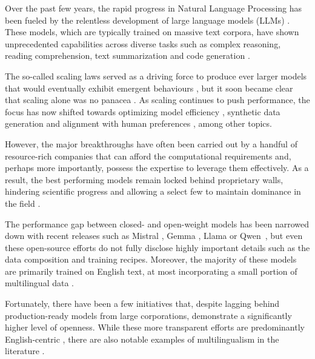 Over the past few years, the rapid progress in Natural Language Processing has been fueled by the relentless development of large language models (LLMs) \cite{survey_llms_1,survey_llms_2}. These models, which are typically trained on massive text corpora, have shown unprecedented capabilities across diverse tasks such as complex reasoning, reading comprehension, text summarization and code generation \cite{big_bench_tasks, measuring_multitask, code_evaluation}. 

The so-called scaling laws \cite{chinchilla,scaling_laws} served as a driving force to produce ever larger models that would eventually exhibit emergent behaviours \cite{emergent_abilities}, but it soon became clear that scaling alone was no panacea \cite{llama1,instructgpt}. As scaling continues to push performance, the focus has now shifted towards optimizing model efficiency \cite{fp8,flash2}, synthetic data generation \cite{survey_sdg1,survey_sdg2} and alignment with human preferences \cite{survey_alignment1,survey_alignment2}, among other topics.

However, the major breakthroughs have often been carried out by a handful of resource-rich companies that can afford the computational requirements and, perhaps more importantly, possess the expertise to leverage them effectively. As a result, the best performing models remain locked behind proprietary walls, hindering scientific progress and allowing a select few to maintain dominance in the field \cite{gpt4,claude3,gemini1p5}. 

The performance gap between closed- and open-weight models has been narrowed down with recent releases such as Mistral \cite{mistral}, Gemma \cite{gemma,gemma2}, Llama \cite{llama1,llama2,llama3} or \mbox{Qwen \cite{qwen1,qwen2}}, but even these open-source efforts do not fully disclose highly important details such as the data composition and training recipes. Moreover, the majority of these models are primarily trained on English text, at most incorporating a small portion of multilingual data \cite{nemotron4-15b, nemotron4}. 

Fortunately, there have been a few initiatives that, despite lagging behind production-ready models from large corporations, demonstrate a significantly higher level of openness. While these more transparent efforts are predominantly English-centric \cite{falcon, pythia, olmo, tulu3}, there are also notable examples of multilingualism in the literature \cite{bloom, eurollm, ali_teuken-7b-base_2024}. %


